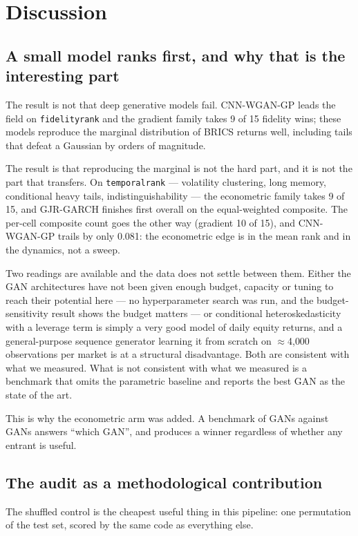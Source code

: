 \documentclass[11pt,a4paper]{article}
\makeatletter
\DeclareRobustCommand{\_}{\ifmmode\nfss@text{\textunderscore}\else\textunderscore\allowbreak\fi}
\makeatother
\begin{document}
\section{Discussion}
\label{sec:discussion}

\subsection{A small model ranks first, and why that is the interesting part}
The result is not that deep generative models fail. CNN-WGAN-GP leads the field on \texttt{fidelity\_rank} and the gradient family takes 9 of 15 fidelity wins; these models reproduce the marginal distribution of BRICS returns well, including tails that defeat a Gaussian by orders of magnitude.

The result is that reproducing the marginal is not the hard part, and it is not the part that transfers. On \texttt{temporal\_rank} --- volatility clustering, long memory, conditional heavy tails, indistinguishability --- the econometric family takes 9 of 15, and GJR-GARCH finishes first overall on the equal-weighted composite. The per-cell composite count goes the other way (gradient 10 of 15), and CNN-WGAN-GP trails by only 0.081: the econometric edge is in the mean rank and in the dynamics, not a sweep.

Two readings are available and the data does not settle between them. Either the GAN architectures have not been given enough budget, capacity or tuning to reach their potential here --- no hyperparameter search was run, and the budget-sensitivity result shows the budget matters --- or conditional heteroskedasticity with a leverage term is simply a very good model of daily equity returns, and a general-purpose sequence generator learning it from scratch on $\approx$4{,}000 observations per market is at a structural disadvantage. Both are consistent with what we measured. What is not consistent with what we measured is a benchmark that omits the parametric baseline and reports the best GAN as the state of the art.

This is why the econometric arm was added. A benchmark of GANs against GANs answers ``which GAN'', and produces a winner regardless of whether any entrant is useful.

\subsection{The audit as a methodological contribution}
The shuffled control is the cheapest useful thing in this pipeline: one permutation of the test set, scored by the same code as everything else.
\end{document}
